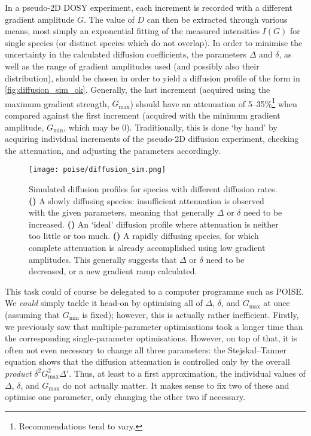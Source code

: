 In a pseudo-2D DOSY experiment, each increment is recorded with a different gradient amplitude $G$.
The value of $D$ can then be extracted through various means, most simply an exponential fitting of the measured intensities $I(G)$ for single species (or distinct species which do not overlap).
In order to minimise the uncertainty in the calculated diffusion coefficients, the parameters $\Delta$ and $\delta$, as well as the range of gradient amplitudes used (and possibly also their distribution), should be chosen in order to yield a diffusion profile of the form in \cref{fig:diffusion_sim_ok}.
Generally, the last increment (acquired using the maximum gradient strength, $G_\text{max}$) should have an attenuation of 5--35\%\footnote{Recommendations tend to vary.} when compared against the first increment (acquired with the minimum gradient amplitude, $G_\text{min}$, which may be 0).
Traditionally, this is done `by hand' by acquiring individual increments of the pseudo-2D diffusion experiment, checking the attenuation, and adjusting the parameters accordingly.\autocite{Johnson1999PNMRS,Claridge2016}

\begin{figure}[htb]
    \centering
    \texttt{[image: poise/diffusion\_sim.png]}%
    {\label{fig:diffusion_sim_weak}}%
    {\label{fig:diffusion_sim_ok}}%
    {\label{fig:diffusion_sim_strong}}%
    \caption[Simulated diffusion profiles for slow, intermediate, and rapid diffusion]{
        Simulated diffusion profiles for species with different diffusion rates.
        \textbf{()} A slowly diffusing species: insufficient attenuation is observed with the given parameters, meaning that generally $\Delta$ or $\delta$ need to be increased.
        \textbf{()} An `ideal' diffusion profile where attenuation is neither too little or too much.
        \textbf{()} A rapidly diffusing species, for which complete attenuation is already accomplished using low gradient amplitudes. This generally suggests that $\Delta$ or $\delta$ need to be decreased, or a new gradient ramp calculated.
    }
    \label{fig:diffusion_sim}
\end{figure}

This task could of course be delegated to a computer programme such as POISE.
We \textit{could} simply tackle it head-on by optimising all of $\Delta$, $\delta$, and $G_\text{max}$ at once (assuming that $G_\text{min}$ is fixed); however, this is actually rather inefficient.
Firstly, we previously saw that multiple-parameter optimisations took a longer time than the corresponding single-parameter optimisations.
However, on top of that, it is often not even necessary to change all three parameters: the Stejskal--Tanner equation shows that the diffusion attenuation is controlled only by the overall \textit{product} $\delta^2 G_\text{max}^2 \Delta'$.
Thus, at least to a first approximation, the individual values of $\Delta$, $\delta$, and $G_\text{max}$ do not actually matter.
It makes sense to fix two of these and optimise one parameter, only changing the other two if necessary.

